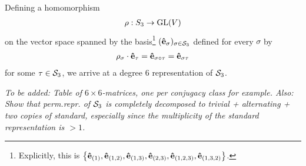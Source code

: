 	\begin{example}\label{example:regSym3}
		Defining a homomorphism \begin{align*}
			\rho: S_3 \rightarrow \text{GL}(V)
		\end{align*} on the vector space spanned by the basis\footnote{Explicitly, this is $\left\lbrace \mathbf{\hat{e}}_{(1)}, \mathbf{\hat{e}}_{(1,2)}, \mathbf{\hat{e}}_{(1,3)}, \mathbf{\hat{e}}_{(2,3)}, \mathbf{\hat{e}}_{(1,2,3)}, \mathbf{\hat{e}}_{(1,3,2)} \right\rbrace$.} $(\mathbf{\hat{e}}_{\sigma})_{\sigma \in \mathcal{S}_3}$ defined for every $\sigma$ by \begin{align*}
		\rho_\sigma \cdot \mathbf{\hat{e}}_\tau = \mathbf{\hat{e}}_{\sigma \circ \tau} = \mathbf{\hat{e}}_{\sigma\tau}
		\end{align*} for some $\tau \in \mathcal{S}_3$, we arrive at a degree 6 representation of $\mathcal{S}_3$. %
		
		\textit{To be added: Table of $6 \times 6$-matrices, one per conjugacy class for example. Also: Show that perm.repr. of $\mathcal{S}_3$ is completely decomposed to trivial + alternating + two copies of standard, especially since the multiplicity of the standard representation is $>1$.}
	\end{example}
	
	

%
%
%
%

